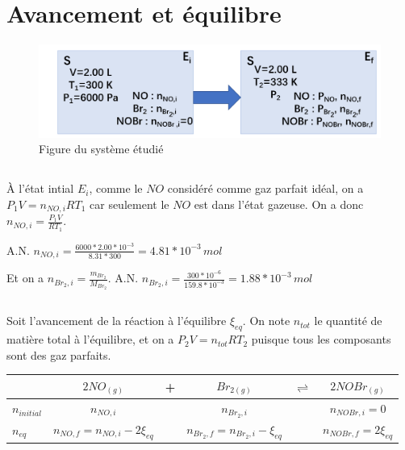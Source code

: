 \documentclass[a4paper,12pt]{book}
\begin{document}
\renewcommand{\labelitemi}{$\blacktriangleright$}
\renewcommand{\labelitemii}{$\bullet$}


\section{Avancement et équilibre}
\begin{figure}[h]
    \begin{center}
    \includegraphics[scale=0.6]{dm3.png}
    \end{center}
    \caption{Figure du système étudié}
\end{figure}
\subsection{}
À l'état intial $E_i$, comme le $NO$ considéré comme gaz parfait idéal, on a 
$P_1V=n_{NO,i}RT_1$ car seulement le $NO$ est dans l'état gazeuse. 
On a donc $\boxed{n_{NO,i}=\frac{P_1V}{RT_1}}$. 

A.N. $\boxed{n_{NO,i}=\frac{6000*2.00*10^{-3}}{8.31*300}=4.81*10^{-3}\,mol}$

Et on a $\boxed{n_{Br_2,i}=\frac{m_{Br_2}}{M_{Br_2}}}$.
A.N. $\boxed{n_{Br_2,i}=\frac{300*10^{-6}}{159.8*10^{-3}}=1.88*10^{-3}\,mol}$
\subsection{}
Soit l’avancement de la réaction à l’équilibre $\xi_{eq}$. On note $n_{tot}$ le quantité de matière total à l’équilibre, 
et on a $P_2V=n_{tot}RT_2$ puisque tous les composants sont des gaz parfaits. 

\begin{table}[h]
\begin{center}
    \begin{tabular}{l|ccccc}
    \hline
                      & $2NO_{(g)}$      & + & $Br_{2(g)}$       & $\rightleftharpoons$ & $2NOBr_{(g)}$\\ \hline
        $n_{initial}$ & $n_{NO,i}$       &   & $n_{Br_2,i}$      &   & $n_{NOBr,i}=0$ \\ 
        $n_{eq}$      & $n_{NO,f}=n_{NO,i}-2\xi_{eq}$  &   & $n_{Br_2,f}=n_{Br_2,i}-\xi_{eq}$  &   & $n_{NOBr,f}=2\xi_{eq}$ \\ 
    \end{tabular}
\end{center}
\end{table}
\end{document}
